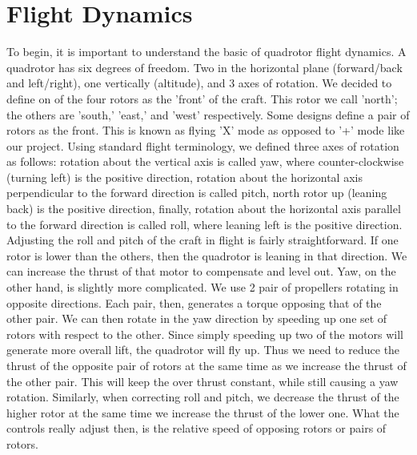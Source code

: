 \section{Flight Dynamics}
	To begin, it is important to understand the basic of quadrotor flight dynamics.  A quadrotor has six degrees of freedom.  Two in the horizontal plane (forward/back and left/right), one vertically (altitude), and 3 axes of rotation.  We decided to define on of the four rotors as the 'front' of the craft.  This rotor we call 'north'; the others are 'south,' 'east,' and 'west' respectively.  Some designs define a pair of rotors as the front.  This is known as flying 'X' mode as opposed to '+' mode like our project.  Using standard flight terminology, we defined three axes of rotation as follows: rotation about the vertical axis is called yaw, where counter-clockwise (turning left) is the positive direction, rotation about the horizontal axis perpendicular to the forward direction is called pitch, north rotor up (leaning back) is the positive direction, finally, rotation about the horizontal axis parallel to the forward direction is called roll, where leaning left is the positive direction.
	Adjusting the roll and pitch of the craft in flight is fairly straightforward.  If one rotor is lower than the others, then the quadrotor is leaning in that direction.  We can increase the thrust of that motor to compensate and level out.  Yaw, on the other hand, is slightly more complicated.  We use 2 pair of propellers rotating in opposite directions.  Each pair, then, generates a torque opposing that of the other pair.  We can then rotate in the yaw direction by speeding up one set of rotors with respect to the other.  Since simply speeding up two of the motors will generate more overall lift, the quadrotor will fly up.  Thus we need to reduce the thrust of the opposite pair of rotors at the same time as we increase the thrust of the other pair.  This will keep the over thrust constant, while still causing a yaw rotation.  Similarly, when correcting roll and pitch, we decrease the thrust of the higher rotor at the same time we increase the thrust of the lower one.  What the controls really adjust then, is the relative speed of opposing rotors or pairs of rotors.
